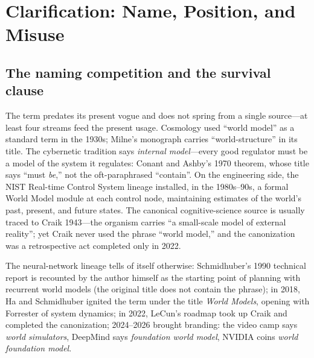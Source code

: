 \documentclass[10pt]{article}
\begin{document}
\section{Clarification: Name, Position, and Misuse}\label{sec:clarify}

\subsection{The naming competition and the survival clause}\label{sec:naming}

The term predates its present vogue and does not spring from a single source---at least four streams feed the present usage. Cosmology used ``world model'' as a standard term in the 1930s; Milne's monograph carries ``world-structure'' in its title\cite{milne1935}. The cybernetic tradition says \emph{internal model}---every good regulator must be a model of the system it regulates: Conant and Ashby's 1970 theorem, whose title says ``must \emph{be},'' not the oft-paraphrased ``contain''\cite{conant1970}. On the engineering side, the NIST Real-time Control System lineage installed, in the 1980s--90s, a formal World Model module at each control node, maintaining estimates of the world's past, present, and future states\cite{albus2002rcs}. The canonical cognitive-science source is usually traced to Craik 1943---the organism carries ``a small-scale model of external reality''\cite{craik1943}; yet Craik never used the phrase ``world model,'' and the canonization was a retrospective act completed only in 2022\cite{lecun2022path}.

The neural-network lineage tells of itself otherwise: Schmidhuber's 1990 technical report is recounted by the author himself as the starting point of planning with recurrent world models (the original title does not contain the phrase)\cite{schmidhuber1990}; in 2018, Ha and Schmidhuber ignited the term under the title \emph{World Models}\cite{ha2018world}, opening with Forrester of system dynamics\cite{forrester1971}; in 2022, LeCun's roadmap took up Craik and completed the canonization\cite{lecun2022path}; 2024--2026 brought branding: the video camp says \emph{world simulators}\cite{openai2024sora}, DeepMind says \emph{foundation world model}\cite{deepmind2025genie3}, NVIDIA coins \emph{world foundation model}\cite{nvidia2025cosmos}.
\end{document}
